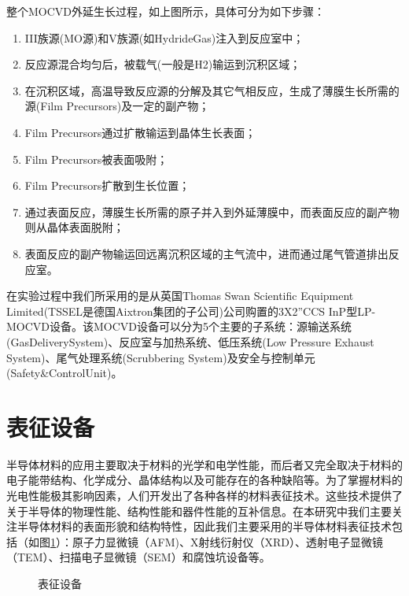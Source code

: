 整个MOCVD外延生长过程，如上图所示，具体可分为如下步骤：
\begin{enumerate}[(1)]
	\setlength{\itemsep}{-3pt}
	\item III族源(MO源)和V族源(如HydrideGas)注入到反应室中；
	\item 反应源混合均匀后，被载气(一般是H2)输运到沉积区域；
	\item 在沉积区域，高温导致反应源的分解及其它气相反应，生成了薄膜生长所需的源(Film Precursors)及一定的副产物；
	\item Film Precursors通过扩散输运到晶体生长表面；
	\item Film Precursors被表面吸附；
	\item Film Precursors扩散到生长位置；
	\item 通过表面反应，薄膜生长所需的原子并入到外延薄膜中，而表面反应的副产物则从晶体表面脱附；
	\item 表面反应的副产物输运回远离沉积区域的主气流中，进而通过尾气管道排出反应室。
\end{enumerate}

在实验过程中我们所采用的是从英国Thomas Swan Scientific Equipment Limited(TSSEL是德国Aixtron集团的子公司)公司购置的3X2”CCS InP型LP-MOCVD设备。该MOCVD设备可以分为5个主要的子系统：源输送系统(GasDeliverySystem)、反应室与加热系统、低压系统(Low Pressure Exhaust System)、尾气处理系统(Scrubbering System)及安全与控制单元(Safety\&ControlUnit)。


\section{表征设备}

半导体材料的应用主要取决于材料的光学和电学性能，而后者又完全取决于材料的电子能带结构、化学成分、晶体结构以及可能存在的各种缺陷等。为了掌握材料的光电性能极其影响因素，人们开发出了各种各样的材料表征技术。这些技术提供了关于半导体的物理性能、结构性能和器件性能的互补信息。在本研究中我们主要关注半导体材料的表面形貌和结构特性，因此我们主要采用的半导体材料表征技术包括（如图\ref{fig:view}）：原子力显微镜（AFM)、X射线衍射仪（XRD）、透射电子显微镜（TEM）、扫描电子显微镜（SEM）和腐蚀坑设备等。

\begin{figure}[!htb]
	\centering
	\caption{表征设备}
	\label{fig:view}
\end{figure}

